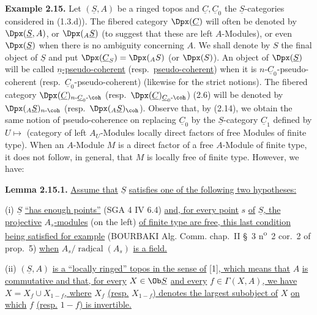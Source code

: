 \textbf{Example 2.15.} Let \((\underline{S},A)\) be a ringed topos and \(\underline{C},\underline{C}_0\) the \(\underline{S}\)-categories considered in (1.3.d)). The fibered category \(\Dpx(\underline{C})\) will often be denoted by \(\Dpx(\underline{S},A)\), or \(\Dpx({}_A \underline{S})\) (to
%
suggest that these are left \(A\)-Modules), or even \(\Dpx(\underline{S})\) when there is no ambiguity concerning \(A\). We shall denote by \(S\) the final object of \(\underline{S}\) and put \(\Dpx(\underline{C}_S)=\Dpx({}_A S)\) (or \(\Dpx(S)\)). An object of \(\Dpx(\underline{S})\) will be called \(\underline{n}\)\uline{-pseudo-coherent} (resp.\ \uline{pseudo-coherent}) when it is \(n\)-\(\underline{C}_0\)-pseudo-coherent (resp.\ \(\underline{C}_0\)-pseudo-coherent) (likewise for the strict notions). The fibered category \(\Dpx(\underline{C})_{n\text{-}\underline{C}_0\text{-}\coh}\) (resp.\ \(\Dpx(\underline{C})_{\underline{C}_0\text{-}\coh}\)) (2.6) will be denoted by \(\Dpx({}_A \underline{S})_{n\text{-}\coh}\) (resp.\ \(\Dpx({}_A \underline{S})_{\coh}\)). Observe that, by (2.14), we obtain the same notion of pseudo-coherence on replacing \(\underline{C}_0\) by the \(\underline{S}\)-category \(\underline{C}_1\) defined by \(U\longmapsto\) (category of left \(A_U\)-Modules locally direct factors of free Modules of finite type). When an \(A\)-Module \(M\) is a direct factor of a free \(A\)-Module of finite type, it does not follow, in general, that \(M\) is locally free of finite type. However, we have:

\textbf{Lemma 2.15.1.} \uline{Assume that} \(\underline{S}\) \uline{satisfies one of the following two hypotheses:}

(i) \(\underline{S}\) \uline{``has enough points''} (SGA 4 IV 6.4) \uline{and, for every point} \(s\) \uline{of} \(\underline{S}\)\uline{, the projective} \(A_s\)\uline{-modules} (on the left) \uline{of finite type are free, this last condition being satisfied for example} (BOURBAKI Alg. Comm. chap.\ II \S~3 n\textsuperscript{o}~2 cor.~2 of prop.\ 5) \uline{when} \(A_s/\underline{\operatorname{radical}}(A_s)\) \uline{is a field.}

(ii) \((\underline{S},A)\) \uline{is a ``locally ringed'' topos in the sense of} [1]\uline{, which means that} \(A\) \uline{is commutative and that, for every} \(X\in\Ob \underline{S}\) \uline{and every} \(f\in\Gamma(X,A)\)\uline{, we have} \(X=X_f\cup X_{1-f}\)\uline{, where} \(X_f\) \uline{(resp.} \(X_{1-f}\)\uline{) denotes the largest subobject of} \(X\) \uline{on which} \(f\) \uline{(resp.} \(1-f\)\uline{) is invertible.}

